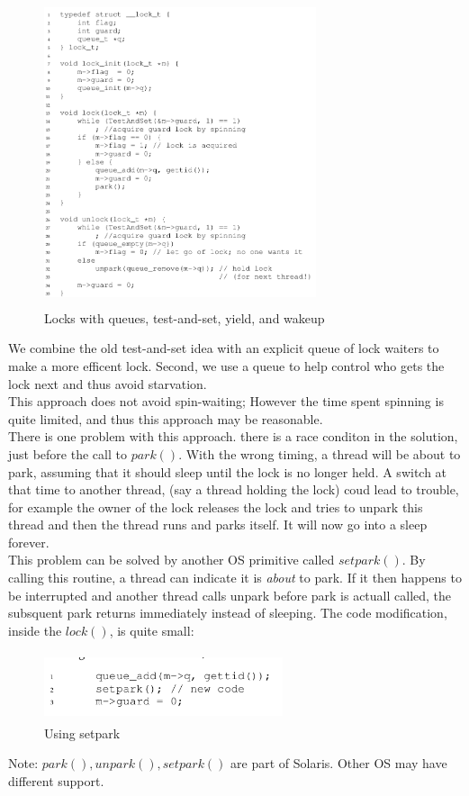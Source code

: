 \begin{figure}[h!]
    \begin{center}
        \includegraphics[width=8cm, height=9cm]{img/289.png}
        \caption{Locks with queues, test-and-set, yield, and wakeup}
    \end{center}
\end{figure}

We combine the old test-and-set idea with an explicit queue of lock waiters to
make a more efficent lock. Second, we use a queue to help control who gets the
lock next and thus avoid starvation.\\

This approach does not avoid spin-waiting; However the time spent spinning is
quite limited, and thus this approach may be reasonable.\\

There is one problem with this approach. there is a race conditon in the solution,
just before the call to $park()$. With the wrong timing, a thread
will be about to park, assuming that it should sleep until the lock is no longer
held. A switch at that time to another thread, (say a thread holding the lock)
coud lead to trouble, for example the owner of the lock releases the lock
and tries to unpark this thread and then the thread runs and parks itself.
It will now go into a sleep forever.\\

This problem can be solved by another OS primitive called $setpark()$. By
calling this routine, a thread can indicate it is \textit{about} to park.
If it then happens to be interrupted and another thread calls unpark
before park is actuall called, the subsquent park returns immediately instead
of sleeping. The code modification, inside the $lock()$, is quite small:

\begin{figure}[h!]
    \begin{center}
        \includegraphics[width=7cm, height=2cm]{img/setpark.png}
        \caption{Using setpark}
    \end{center}
\end{figure}

Note: $park(), unpark(), setpark()$ are part of Solaris. Other OS may have 
different support.
